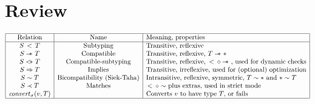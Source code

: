 \documentclass{article}
\newcommand{\fun}[1]{\mbox{\it #1\/}}
\newcommand{\dynamic}{\t{*}}
\newcommand{\matches}[2]{#1 \prec #2}
\newcommand{\subtypeword}{\,<\,}
\newcommand{\subtype}[2]{#1 \subtypeword #2}
\newcommand{\compatible}[2]{#1 \leadsto #2}
\renewcommand{\compatible}[2]{#1 -\!\!\!*\,\, #2}
\newcommand{\comsubtype}[2]{#1 <\!\!\leadsto #2}
\renewcommand{\comsubtype}[2]{#1 <\!\!\!*\,\, #2}
\newcommand{\bicompatible}[2]{#1 \sim #2}
\newcommand{\convert}[2]{{#1}\convertword{#2}}
\newcommand{\convertword}{\mbox{\,\,$\sim :$\,\,}}
\newcommand{\implies}[2]{#1\Implies #2}
\renewcommand{\t}[1]{{\tt #1}}
\newcommand{\Implies}[0]{\Rightarrow}
\renewcommand{\convert}[2]{\fun{convert}_{\sigma}(#1,#2)}
\begin{document}

\section{Review}

\[
\begin{array}{|c|c|l|}
\hline
\mbox{Relation} & \mbox{Name} & \mbox{Meaning, properties} \\
\hline
\subtype{S}{T} 			& \mbox{Subtyping} 			& \mbox{Transitive, reflexive}\\
\compatible{S}{T}		&\mbox{Compatible}		& \mbox{Transitive, reflexive, $\compatible{T}{\dynamic}$} \\
\comsubtype S T		&\mbox{Compatible-subtyping} & \mbox{Transitive, reflexive, $\subtype{}{}\circ\compatible{}{}$, used for dynamic checks}\\
\implies S T 			&\mbox{Implies}			&\mbox{Transitive, irreflexive, used for (optional) optimization}\\
\bicompatible S T			&\mbox{Bicompatibility (Siek-Taha)}		&\mbox{Intransitive, reflexive, symmetric, $\bicompatible T \dynamic$ and $\bicompatible \dynamic T$} \\
\matches S T			&\mbox{Matches}				&\mbox{$\subtype{}{}\circ\bicompatible{}{}$ plus extras, used in strict mode}\\
\convert v T			&\mbox{}					&\mbox{Converts $v$ to have type $T$, or fails} \\
\hline
\end{array}
\]
\end{document}
